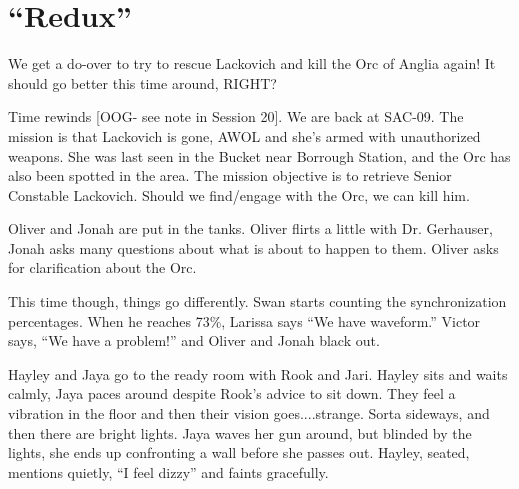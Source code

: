 \setcounter{chapter}{ 20 }
\chapter{\textbf{``Redux''} }










We get a do-over to try to rescue Lackovich and kill the Orc of Anglia again!   It should go better this time around, RIGHT?





\noindent\hrulefill





Time rewinds {[}OOG- see note in Session 20{]}.  We are back at SAC-09.  The mission is that Lackovich is gone, AWOL and she's armed with unauthorized weapons.  She was last seen in the Bucket near Borrough Station, and the Orc has also been spotted in the area.  The mission objective is to retrieve Senior Constable Lackovich.  Should we find/engage with the Orc, we can kill him. 



Oliver and Jonah are put in the tanks. Oliver flirts a little with Dr. Gerhauser, Jonah asks many questions about what is about to happen to them.  Oliver asks for clarification about the Orc.  



This time though, things go differently.  Swan starts counting the synchronization percentages.  When he reaches 73\%, Larissa says ``We have waveform.''  Victor says, ``We have a problem!'' and Oliver and Jonah black out.



Hayley and Jaya go to the ready room with Rook and Jari.  Hayley sits and waits calmly, Jaya paces around despite Rook's advice to sit down.  They feel a vibration in the floor and then their vision goes....strange. Sorta sideways, and then there are bright lights.  Jaya waves her gun around, but blinded by the lights, she ends up confronting a wall before she passes out.  Hayley, seated, mentions quietly, ``I feel dizzy'' and faints gracefully.



